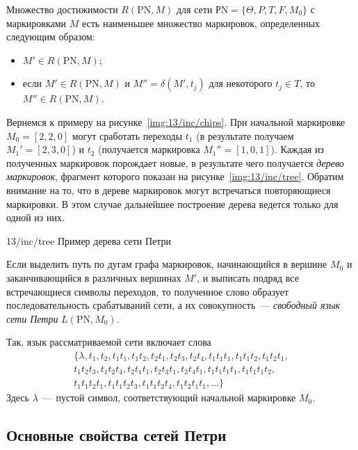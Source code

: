 Множество достижимости ${R(\text{PN}, M)}$ для сети ${\text{РN} = \{ \Theta, P, T, F, M_0 \}}$ с маркировками $M$ есть наименьшее множество маркировок, определенных следующим образом:

\begin{itemize}
    \item ${M'\in R(\text{PN}, M)}$;
    \item если ${M'\in R(\text{PN}, M)}$ и $M'' = \delta(M', t_j)$ для некоторого ${t_j\in T}$, то $M''\in R(\text{PN}, M)$.
\end{itemize}

Вернемся к примеру на рисунке~\ref{img:13/inc/chips}. При начальной маркировке ${M_0 = [2, 2, 0]}$ могут сработать переходы $t_1$ (в результате получаем ${M_1' = [2, 3, 0]}$) и $t_2$ (получается маркировка ${M_1'' = [1, 0, 1]}$). Каждая из полученных маркировок порождает новые, в результате чего получается \textit{дерево маркировок}, фрагмент которого показан на рисунке~\ref{img:13/inc/tree}. Обратим внимание на то, что в дереве маркировок могут встречаться повторяющиеся маркировки. В этом случае дальнейшее построение дерева ведется только для одной из них.

\image
{\textwidth}
{13/inc/tree}
{Пример дерева сети Петри}

Если выделить путь по дугам графа маркировок, начинающийся в вершине $M_0$ и заканчивающийся в различных вершинах $M'$, и выписать подряд все встречающиеся символы переходов, то полученное слово образует последовательность срабатываний сети, а их совокупность~--- \textit{свободный язык сети Петри} ${L(\text{PN}, M_0)}$.

Так, язык рассматриваемой сети включает слова
%
\begin{equation*}
 \begin{aligned}
    \{\lambda, t_1, t_2, t_1t_1, t_1t_2, t_2t_1, t_2t_3, t_2t_4, t_1t_1t_1, t_1t_1t_2, t_1t_2t_1,\\ t_1t_2t_3, t_1t_2t_4, t_2t_1t_1, t_2t_3t_1, t_2t_4t_1, t_1t_1t_1t_1, t_1t_1t_1t_2,\\ t_1t_1t_2t_1, t_1t_1t_2t_3, t_1t_1t_2t_4, t_1t_2t_1t_1, \dots \}
 \end{aligned}   
\end{equation*}
%
Здесь $\lambda$~--- пустой символ, соответствующий начальной маркировке $M_0$.

\subsection{Основные свойства сетей Петри}

